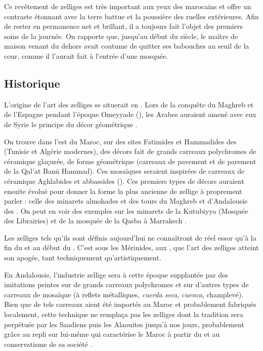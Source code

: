 Ce revêtement de zelliges est très important aux yeux des marocains 
et offre un contraste étonnant avec la terre battue et la poussière 
des ruelles extérieures. Afin de rester en permanence net et brillant, 
il a toujours fait l'objet des premiers soins de la journée. On 
rapporte que, jusqu'au début du siècle, le maître de maison venant du 
dehors avait coutume de quitter ses babouches au seuil de la cour, 
comme il l'aurait fait à l'entrée d'une mosquée.

\subsection{Historique}
L'origine de l'art des zelliges se situerait en . 
Lors de la conquête du Maghreb et de l'Espagne pendant l'époque 
Omeyyade (), les Arabes auraient amené avec eux de 
Syrie le principe du décor géométrique \autocite{Damluji_1993a}.

On trouve dans l'est du Maroc, sur des sites Fatimides et Hammadides 
des  (Tunisie et Algérie modernes), des 
décors fait de grands carreaux polychromes de céramique glaçurée, de 
forme géométrique (carreaux de pavement et de parement de la Qal'at 
Ban\=u Hammad). Ces mosaïques seraient inspirées de carreaux de 
céramique Aghlabides et abbassides (). Ces 
premiers types de décors auraient ensuite évolué pour donner la 
forme la plus ancienne de zellige à proprement parler : celle des 
minarets almohades et des tours du Maghreb et d'Andalousie des
. On peut en voir des exemples 
 sur les minarets de la 
Kutubiyya (Mosquée des Librairies) et de la mosquée de la Qasba à 
Marrakech \autocite{Damluji_1993a}.

Les zelliges tels qu'ils sont définis aujourd'hui  ne connaîtront de réel essor qu'à la fin du 
 et au début du . C'est sous les Mérinides, 
aux , que l'art des zelliges atteint son 
apogée, tant techniquement qu'artistiquement.

En Andalousie, l'industrie zellige sera à cette époque supplantée 
par des imitations peintes sur de grands carreaux polychromes et 
sur d'autres types de carreaux de mosaïque (à reflets métalliques, 
\emph{cuerda seca}, \emph{cuenca}, champlevé). Bien que de tels 
carreaux aient été importés au Maroc et probablement fabriqués 
localement, cette technique ne remplaça pas les zelliges dont la 
tradition sera perpétuée par les Saadiens puis les Alaouites jusqu'à 
nos jours, probablement grâce au repli sur lui-même qui caractérise 
le Maroc à partir du  et au conservatisme de sa société 
\autocite{Damluji_1993a}.


